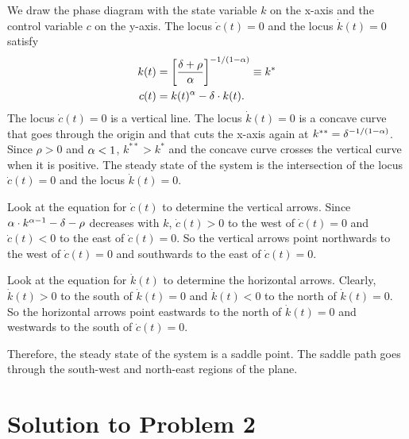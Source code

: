 \documentclass[letterpaper,12pt,leqno]{article}
\begin{document}
\begin{enumerate}
We draw the phase diagram with the state variable $k$ on the x-axis
and the control variable $c$ on the y-axis. The locus $\dot{c}(t)=0$ and the locus $\dot{k}(t)=0$ satisfy
\begin{align*}
k(t)&=\left[\frac{\delta +\rho}{\alpha}\right]^{-1/(1-\alpha)}\equiv k^{*}\\
c(t)&=k(t)^{\alpha}-\delta\cdot k(t).
\end{align*}
The locus  $\dot{c}(t)=0$ is a vertical line. The locus $\dot{k}(t)=0$ is a concave curve that goes through the origin and that cuts the x-axis again at $k^{**}=\delta^{-1/(1-\alpha)}$. Since $\rho>0$ and $\alpha<1$, $k^{**}>k^{*}$ and the concave curve crosses the vertical curve when it is positive. The steady state of the system is the intersection of the locus  $\dot{c}(t)=0$  and the locus $\dot{k}(t)=0$.

Look at the equation for $\dot{c}(t)$ to determine the vertical arrows. Since $\alpha\cdot k^{\alpha-1}-\delta -\rho$ decreases with $k$, $\dot{c}(t)>0$ to the west of $\dot{c}(t)=0$  and $\dot{c}(t)<0$  to the east of $\dot{c}(t)=0$. So the vertical arrows point northwards to the west of $\dot{c}(t)=0$ and southwards to the east of $\dot{c}(t)=0$. 

Look at the equation for $\dot{k}(t)$ to determine the horizontal arrows. Clearly, $\dot{k}(t)>0$ to the south of $\dot{k}(t)=0$ and $\dot{k}(t)<0$ to the north of $\dot{k}(t)=0$. So the horizontal arrows point eastwards to the north of $\dot{k}(t)=0$ and westwards to the south of $\dot{c}(t)=0$. 

Therefore, the steady state of the system is a saddle point. The saddle path goes through the south-west and north-east regions of the plane. 

\end{enumerate}


\section*{Solution to Problem 2} 
\end{document}
